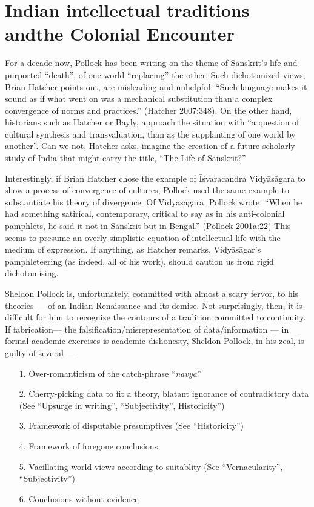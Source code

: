 \section{Indian intellectual traditions and\hfill\break the Colonial Encounter}%

For a decade now, Pollock has been writing on the theme of Sanskrit’s life and purported “death”, of one world “replacing” the other. Such dichotomized views, Brian Hatcher points out, are misleading and unhelpful: “Such language makes it sound as if what went on was a mechanical substitution than a complex convergence of norms and practices.” (Hatcher 2007:348). On the other hand, historians such as Hatcher or Bayly, approach the situation with “a question of cultural synthesis and transvaluation, than as the supplanting of one world by another”. Can we not, Hatcher asks, imagine the creation of a future scholarly study of India that might carry the title, “The Life of Sanskrit?”  

Interestingly, if  Brian Hatcher chose the example of Īśvaracandra Vidyāsāgara to show a process of convergence of cultures, Pollock used the same example to substantiate his theory of divergence. Of Vidyāsāgara, Pollock wrote, “When he had something satirical, contemporary, critical to say as in his anti-colonial pamphlets, he said it not in Sanskrit but in Bengal.” (Pollock 2001a:22) This seems to presume an overly simplistic equation of intellectual life with the medium of expression. If anything, as Hatcher remarks, Vidyāsāgar’s pamphleteering (as indeed, all of his work), should caution us from rigid dichotomising.

Sheldon Pollock is, unfortunately, committed with almost a scary fervor, to his theories — of an Indian Renaissance and its demise. Not surprisingly, then, it is difficult for him to recognize the contours of a tradition committed to continuity. If fabrication— the falsification/misrepresentation of data/information —  in formal academic exercises is academic dishonesty, Sheldon Pollock, in his zeal, is guilty of several — 
\begin{itemize}
\itemsep=1pt
\item[1.] Over-romanticism of the catch-phrase “{\sl navya}”
\item[2.] Cherry-picking data to fit a theory, blatant ignorance of contradictory data (See “Upsurge in writing”, “Subjectivity”, Historicity”)
\item[3.] Framework of disputable presumptives (See “Historicity”)
\item[4.] Framework of foregone conclusions 
\item[5.] Vacillating world-views according to suitablity (See “Vernacularity”, “Subjectivity”)
\item[6.] Conclusions without evidence
\end{itemize}

